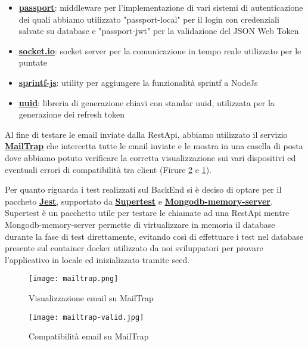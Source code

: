 \begin{itemize}
	\item \textbf{\underline{\href{http://www.passportjs.org}{passport}}}: middleware per l'implementazione di vari sistemi di autenticazione dei quali abbiamo utilizzato "passport-local" per il login con credenziali salvate su database e "passport-jwt" per la validazione del JSON Web Token
	\item \textbf{\underline{\href{https://socket.io/}{socket.io}}}: socket server per la comunicazione in tempo reale utilizzato per le puntate
	\item \textbf{\underline{\href{https://www.npmjs.com/package/sprintf-js}{sprintf-js}}}: utility per aggiungere la funzionalità sprintf a NodeJs
	\item \textbf{\underline{\href{https://www.npmjs.com/package/uuid}{uuid}}}: libreria di generazione chiavi con standar uuid, utilizzata per la generazione dei refresh token
\end{itemize}

Al fine di testare le email inviate dalla RestApi, abbiamo utilizzato il servizio \textbf{\underline{\href{https://mailtrap.io}{MailTrap}}}
che intercetta tutte le email inviate e le mostra in una casella di posta 
dove abbiamo potuto verificare la corretta visualizzazione sui vari dispositivi 
ed eventuali errori di compatibilità tra client (Firure \underline{\ref{fig:mailtrapValid}} e \underline{\ref{fig:mailtrap}}).

Per quanto riguarda i test realizzati sul BackEnd si è deciso di optare per il paccheto \textbf{\underline{\href{https://jestjs.io/docs/getting-started}{Jest}}},
supportato da \textbf{\underline{\href{https://www.npmjs.com/package/supertest}{Supertest}}} e \textbf{\underline{\href{https://github.com/nodkz/mongodb-memory-server}{Mongodb-memory-server}}}.
Supertest è un pacchetto utile per testare le chiamate ad una RestApi mentre 
Mongodb-memory-server permette di virtualizzare in memoria il database durante la fase di test direttamente, 
evitando così di effettuare i test nel database presente sul container docker utilizzato da noi sviluppatori 
per provare l'applicativo in locale ed inizializzato tramite seed. 

\begin{figure}[H]
	\centering
	\texttt{[image: mailtrap.png]}
	\caption{Visualizzazione email su MailTrap}
	\label{fig:mailtrap}
\end{figure}

\begin{figure}[H]
	\centering
	\texttt{[image: mailtrap-valid.jpg]}
	\caption{Compatibilità email su MailTrap}
	\label{fig:mailtrapValid}
\end{figure}

